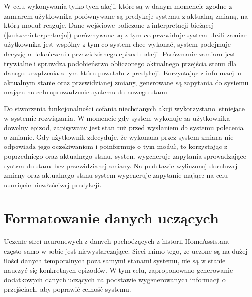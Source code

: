 W celu wykonywania tylko tych akcji, które są w danym momencie zgodne z zamiarem użytkownika porównywane są predykcje systemu z aktualną zmianą, na którą moduł reaguje. Dane wejściowe policzone z interpretacji bieżącej (\ref{subsec:interpretacja}) porównywane są z tym co przewiduje system. Jeśli zamiar użytkownika jest wspólny z tym co system chce wykonać, system podejmuje decyzję o dokończeniu przewidzianego epizodu akcji. Porównanie zamiaru jest trywialne i sprawdza podobieństwo obliczonego aktualnego przejścia stanu dla danego urządzenia z tym które powstało z predykcji. Korzystając z informacji o aktualnym stanie oraz przewidzianej zmiany, generowane są zapytania do systemu mające na celu sprowadzenie systemu do nowego stanu.

Do stworzenia funkcjonalności cofania niechcianych akcji wykorzystano istniejące w systemie rozwiązania. W momencie gdy system wykonuje za użytkownika dowolny epizod, zapisywany jest stan tuż przed wysłaniem do systemu polecenia o zmianie. Gdy użytkownik zdecyduje, że wykonana przez system zmiana nie odpowiada jego oczekiwaniom i poinformuje o tym moduł, to korzystając z poprzedniego oraz aktualnego stanu, system wygeneruje zapytania sprowadzające system do stanu bez przewidzianej zmiany. Na podstawie wyliczonej docelowej zmiany oraz aktualnego stanu system wygeneruje zapytanie mające na celu usunięcie niewłaściwej predykcji.

\section{Formatowanie danych uczących} \label{sec:dane_uczace}
Uczenie sieci neuronowych z danych pochodzących z historii HomeAssistant często samo w sobie jest niewystarczające. Sieci mimo tego, że uczone są na dużej ilości danych temporalnych poza samymi stanami systemu, nie są w stanie nauczyć się konkretnych epizodów. W tym celu, zaproponowano generowanie dodatkowych danych uczących na podstawie wygenerowanych informacji o przejściach, aby poprawić celność systemu.

